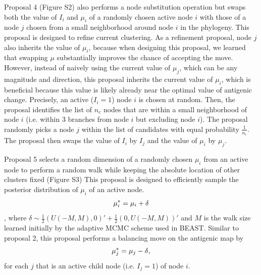 \documentclass[11pt,oneside,letterpaper]{article}
\begin{document}
Proposal 4 (Figure S2) also performs a node substitution operation but swaps both the value of $I_i$ and $\mu_i$ of a randomly chosen active node $i$ with those of a node $j$ chosen from a small neighborhood around node $i$ in the phylogeny. 
This proposal is designed to refine current clustering.
As a refinement proposal, node $j$ also inherits the value of $\mu_i$, because when designing this proposal, we learned that swapping $\mu$ substantially improves the chance of accepting the move.
However, instead of naively using the current value of $\mu_j$, which can be any magnitude and direction, this proposal inherits the current value of  $\mu_i$, which is beneficial because this value is likely already near the optimal value of antigenic change.
Precisely, an active ($I_i=1$) node $i$ is chosen at random.
Then, the proposal identifies the list of $n_{c}$ nodes that are within a small neighborhood of node $i$ (i.e.  within 3 branches from node $i$ but excluding node $i$).
The proposal randomly picks a node $j$ within the list of candidates with equal probability $\frac{1}{n_{c}}$.
The proposal then swaps the value of $I_i$ by $I_j$ and the value of $\mu_i$ by $\mu_j$.



Proposal 5 selects a random dimension of a randomly chosen $\mu_i$ from an active node to perform a random walk while keeping the absolute location of other clusters fixed (Figure S3)
This proposal is designed to efficiently sample the posterior distribution of $\mu_i$ of an active node. 
\begin{equation}
	\mu_i^{*} =  \mu_i + \delta \\
\end{equation},
where $\delta \sim \frac{1}{2} (U(-M, M), 0)' + \frac{1}{2} (0, U(-M, M))'$ and $M$ is the walk size learned initially by the adaptive MCMC scheme used in BEAST.
Similar to proposal 2, this proposal performs a balancing move on the antigenic map by
\begin{equation}
	\mu_j^{*} =  \mu_j - \delta\\     ,
\label{balance_mu}
\end{equation}
for each $j$ that is an active child node (i.e. $I_j = 1$) of node $i$.
\end{document}
